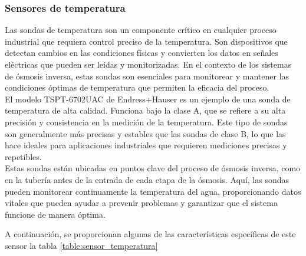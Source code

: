\subsubsection{Sensores de temperatura}

Las sondas de temperatura son un componente crítico en cualquier proceso industrial que requiera control preciso 
de la temperatura. Son dispositivos que detectan cambios en las condiciones físicas y convierten los datos en 
señales eléctricas que pueden ser leídas y monitorizadas. En el contexto de los sistemas de ósmosis inversa, 
estas sondas son esenciales para monitorear y mantener las condiciones óptimas de temperatura que permiten la 
eficacia del proceso.\\

El modelo TSPT-6702UAC de Endress+Hauser es un ejemplo de una sonda de temperatura de alta calidad. Funciona bajo 
la clase A, que se refiere a su alta precisión y consistencia en la medición de la temperatura. 
Este tipo de sondas son generalmente más precisas y estables que las sondas de clase B, lo que 
las hace ideales para aplicaciones industriales que requieren mediciones precisas y repetibles.\\

Estas sondas están ubicadas en puntos clave del proceso de ósmosis inversa, como en la tubería antes de la entrada de cada etapa de la ósmosis. Aquí, las sondas pueden monitorear continuamente la temperatura del agua, proporcionando datos vitales que pueden ayudar a prevenir problemas y garantizar que el sistema funcione de manera óptima.\\



A continuación, se proporcionan algunas de las características específicas de este sensor la tabla \ref{table:sensor_temperatura}\\


